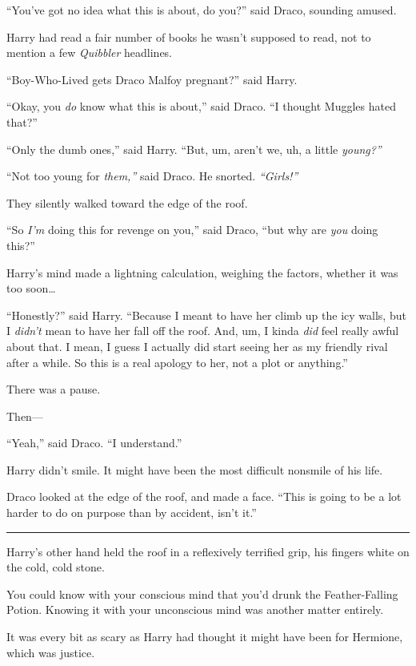 ``You've got no idea what this is about, do you?'' said Draco, sounding
amused.

Harry had read a fair number of books he wasn't supposed to read, not to
mention a few \emph{Quibbler} headlines.

``Boy-Who-Lived gets Draco Malfoy pregnant?'' said Harry.

``Okay, you \emph{do} know what this is about,'' said Draco. ``I thought
Muggles hated that?''

``Only the dumb ones,'' said Harry. ``But, um, aren't we, uh, a little
\emph{young?''}

``Not too young for \emph{them,''} said Draco. He snorted.
\emph{``Girls!''}

They silently walked toward the edge of the roof.

``So \emph{I'm} doing this for revenge on you,'' said Draco, ``but why
are \emph{you} doing this?''

Harry's mind made a lightning calculation, weighing the factors, whether
it was too soon\ldots{}

``Honestly?'' said Harry. ``Because I meant to have her climb up the icy
walls, but I \emph{didn't} mean to have her fall off the roof. And, um,
I kinda \emph{did} feel really awful about that. I mean, I guess I
actually did start seeing her as my friendly rival after a while. So
this is a real apology to her, not a plot or anything.''

There was a pause.

Then---

``Yeah,'' said Draco. ``I understand.''

Harry didn't smile. It might have been the most difficult nonsmile of
his life.

Draco looked at the edge of the roof, and made a face. ``This is going
to be a lot harder to do on purpose than by accident, isn't it.''

\begin{center}\rule{3in}{0.4pt}\end{center}

Harry's other hand held the roof in a reflexively terrified grip, his
fingers white on the cold, cold stone.

You could know with your conscious mind that you'd drunk the
Feather-Falling Potion. Knowing it with your unconscious mind was
another matter entirely.

It was every bit as scary as Harry had thought it might have been for
Hermione, which was justice.

